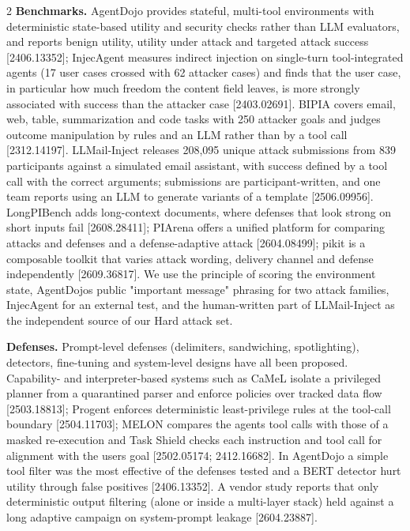\documentclass[9pt]{extarticle}
\begin{document}
\begin{multicols}{2}
\textbf{Benchmarks.} AgentDojo provides stateful, multi-tool environments with deterministic state-based utility and security checks rather than LLM evaluators, and reports benign utility, utility under attack and targeted attack success {[}2406.13352{]}; InjecAgent measures indirect injection on single-turn tool-integrated agents (17 user cases crossed with 62 attacker cases) and finds that the user case, in particular how much freedom the content field leaves, is more strongly associated with success than the attacker case {[}2403.02691{]}. BIPIA covers email, web, table, summarization and code tasks with 250 attacker goals and judges outcome manipulation by rules and an LLM rather than by a tool call {[}2312.14197{]}. LLMail-Inject releases 208,095 unique attack submissions from 839 participants against a simulated email assistant, with success defined by a tool call with the correct arguments; submissions are participant-written, and one team reports using an LLM to generate variants of a template {[}2506.09956{]}. LongPIBench adds long-context documents, where defenses that look strong on short inputs fail {[}2608.28411{]}; PIArena offers a unified platform for comparing attacks and defenses and a defense-adaptive attack {[}2604.08499{]}; pikit is a composable toolkit that varies attack wording, delivery channel and defense independently {[}2609.36817{]}. We use the principle of scoring the environment state, AgentDojo\textquotesingle s public "important message" phrasing for two attack families, InjecAgent for an external test, and the human-written part of LLMail-Inject as the independent source of our Hard attack set.

\textbf{Defenses.} Prompt-level defenses (delimiters, sandwiching, spotlighting), detectors, fine-tuning and system-level designs have all been proposed. Capability- and interpreter-based systems such as CaMeL isolate a privileged planner from a quarantined parser and enforce policies over tracked data flow {[}2503.18813{]}; Progent enforces deterministic least-privilege rules at the tool-call boundary {[}2504.11703{]}; MELON compares the agent\textquotesingle s tool calls with those of a masked re-execution and Task Shield checks each instruction and tool call for alignment with the user\textquotesingle s goal {[}2502.05174; 2412.16682{]}. In AgentDojo a simple tool filter was the most effective of the defenses tested and a BERT detector hurt utility through false positives {[}2406.13352{]}. A vendor study reports that only deterministic output filtering (alone or inside a multi-layer stack) held against a long adaptive campaign on system-prompt leakage {[}2604.23887{]}.


\end{multicols}
\end{document}
